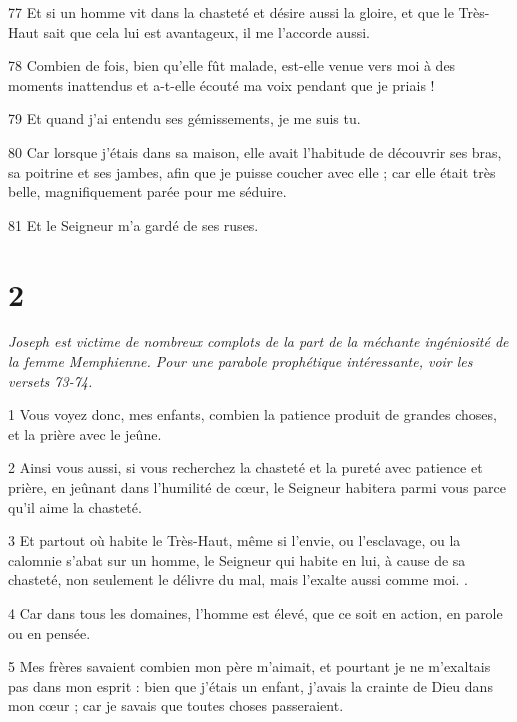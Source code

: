 \par 77 Et si un homme vit dans la chasteté et désire aussi la gloire, et que le Très-Haut sait que cela lui est avantageux, il me l'accorde aussi.

\par 78 Combien de fois, bien qu'elle fût malade, est-elle venue vers moi à des moments inattendus et a-t-elle écouté ma voix pendant que je priais !

\par 79 Et quand j'ai entendu ses gémissements, je me suis tu.

\par 80 Car lorsque j'étais dans sa maison, elle avait l'habitude de découvrir ses bras, sa poitrine et ses jambes, afin que je puisse coucher avec elle ; car elle était très belle, magnifiquement parée pour me séduire.

\par 81 Et le Seigneur m'a gardé de ses ruses.

\chapter{2}

\par \textit{Joseph est victime de nombreux complots de la part de la méchante ingéniosité de la femme Memphienne. Pour une parabole prophétique intéressante, voir les versets 73-74.}

\par 1 Vous voyez donc, mes enfants, combien la patience produit de grandes choses, et la prière avec le jeûne.

\par 2 Ainsi vous aussi, si vous recherchez la chasteté et la pureté avec patience et prière, en jeûnant dans l'humilité de cœur, le Seigneur habitera parmi vous parce qu'il aime la chasteté.

\par 3 Et partout où habite le Très-Haut, même si l'envie, ou l'esclavage, ou la calomnie s'abat sur un homme, le Seigneur qui habite en lui, à cause de sa chasteté, non seulement le délivre du mal, mais l'exalte aussi comme moi. .

\par 4 Car dans tous les domaines, l'homme est élevé, que ce soit en action, en parole ou en pensée.

\par 5 Mes frères savaient combien mon père m'aimait, et pourtant je ne m'exaltais pas dans mon esprit : bien que j'étais un enfant, j'avais la crainte de Dieu dans mon cœur ; car je savais que toutes choses passeraient.

